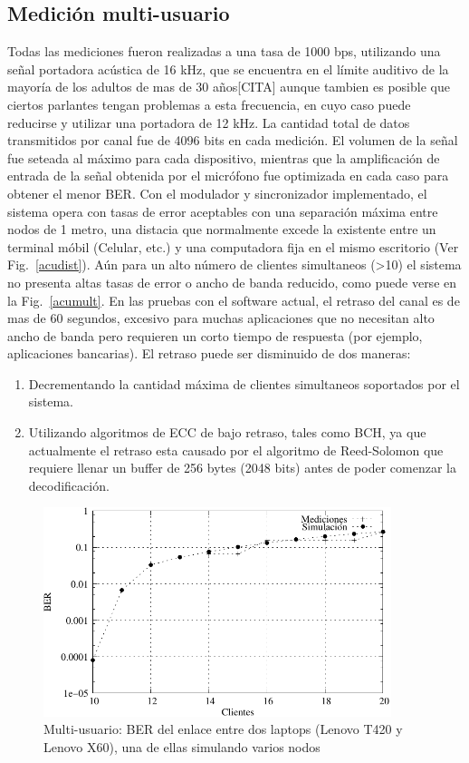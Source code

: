 \subsection{Medición multi-usuario}

Todas las mediciones fueron realizadas a una tasa de 1000 bps, utilizando una señal portadora acústica de 16 kHz, que se encuentra en el límite auditivo de la mayoría de los adultos de mas de 30 años[CITA] aunque tambien es posible que ciertos parlantes tengan problemas a esta frecuencia, en cuyo caso puede reducirse y utilizar una portadora de 12 kHz.
La cantidad total de datos transmitidos por canal fue de 4096 bits en cada medición. El volumen de la señal fue seteada al máximo para cada dispositivo, mientras que la amplificación de entrada de la señal obtenida por el micrófono fue optimizada en cada caso para obtener el menor BER.
Con el modulador y sincronizador implementado, el sistema opera con tasas de error aceptables con una separación máxima entre nodos de 1 metro, una distacia que normalmente excede la existente entre un terminal móbil (Celular, etc.) y una computadora fija en el mismo escritorio (Ver Fig.~\ref{acudist}). Aún para un alto número de clientes simultaneos (>10) el sistema no presenta altas tasas de error o ancho de banda reducido, como puede verse en la Fig.~\ref{acumult}.
En las pruebas con el software actual, el retraso del canal es de mas de 60 segundos, excesivo para muchas aplicaciones que no necesitan alto ancho de banda pero requieren un corto tiempo de respuesta (por ejemplo, aplicaciones bancarias). El retraso puede ser disminuido de dos maneras: 
\begin{enumerate}
 \item Decrementando la cantidad máxima de clientes simultaneos soportados por el sistema.
 \item Utilizando algoritmos de ECC de bajo retraso, tales como BCH, ya que actualmente el retraso esta causado por el algoritmo de Reed-Solomon que requiere llenar un buffer de 256 bytes (2048 bits) antes de poder comenzar la decodificación.
\end{enumerate}

\begin{figure}[t]
  \centering
    \includegraphics[width=4in]{graphs/medidas_clientes_JIS-fig6.pdf}
\caption {Multi-usuario: BER del enlace entre dos laptops (Lenovo T420 y Lenovo X60), una de ellas simulando varios nodos}
\label{fig:acumult}
\end{figure}


